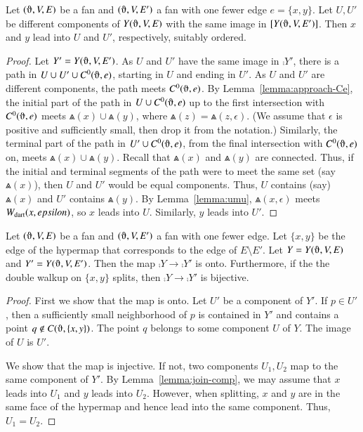 \begin{lemma}
Let $(\orgn,V,E)$ be a fan and $(\orgn,V,E')$
a fan with one fewer edge $e=\{x,y\}$.
Let $U,U'$ be different
components of $Y(\orgn,V,E)$ with the same
image in $\comp{Y(\orgn,V,E')}$.  Then 
$x$ and $y$ lead into $U$ and $U'$, respectively, suitably ordered.
\end{lemma}

\begin{proof}  Let $Y'=Y(\orgn,V,E')$.
As $U$ and $U'$ have the same image in $\comp{Y'}$,
there is a path in $U\cup U'\cup C^0(\orgn,e)$, starting in $U$
and ending in $U'$.  As $U$ and $U'$ are different components,
the path meets $C^0(\orgn,e)$.
By Lemma~\ref{lemma:approach-Ce}, the
initial part of the path in $U\cup C^0(\orgn,e)$ up to the first
intersection with $C^0(\orgn,e)$ meets $\Wedge(x)\cup \Wedge(y)$, where
  $
  \Wedge(z) = 
    \Wedge(z,\epsilon).
  $
(We assume that $\epsilon$ is positive and sufficiently
small, then drop it from the notation.)
Similarly, the terminal part of the path in $U'\cup C^0(\orgn,e)$, 
from the
final intersection with $C^0(\orgn,e)$ on, meets $\Wedge(x)\cup \Wedge(y)$.
Recall that $\Wedge(x)$ and $\Wedge(y)$ are connected.  Thus,
if the initial and terminal segments of the path were to
meet the
same set (say $\Wedge(x)$), then $U$ and $U'$ would be equal components.
Thus, $U$ contains (say) $\Wedge(x)$ and $U'$ contains $\Wedge(y)$.
By Lemma~\ref{lemma:umu}, $\Wedge(x,\epsilon)$ meets $W_{\text{dart}}(x,epsilon)$,
so $x$ leads into $U$.  Similarly, $y$ leads into $U'$.
\end{proof}


\begin{lemma}
Let $(\orgn,V,E)$ be a fan and $(\orgn,V,E')$
a fan with one fewer edge.  Let $\{x,y\}$ be the edge of the hypermap
that corresponds to the edge of $E\setminus E'$.
Let $Y=Y(\orgn,V,E)$ and $Y'=Y(\orgn,V,E')$.
Then
the map  $\comp{Y}\to \comp{Y'}$ is onto.
Furthermore, if the the double walkup
on $\{x,y\}$ splits,
then $\comp{Y}\to\comp{Y'}$ is bijective.
\end{lemma}

\begin{proof}
First we show that the map is onto.  Let $U'$
be a component of $Y'$.  If $p\in U'$,
then a sufficiently small neighborhood of $p$ is contained
in $Y'$ and contains a point $q\not\in C(\orgn,\{x,y\})$.  The
point $q$ belongs to some component $U$ of $Y$.  The image
of $U$ is $U'$.

We show that the map is injective.  If not, two
components $U_1,U_2$ map to the same component of $Y'$.
By Lemma~\ref{lemma:join-comp}, we may assume
that $x$ leads into $U_1$ and
$y$ leads into $U_2$.
However, when splitting, $x$ and $y$ are in the same face of
the hypermap and hence lead into the
same component.  Thus, $U_1=U_2$.
\end{proof}

